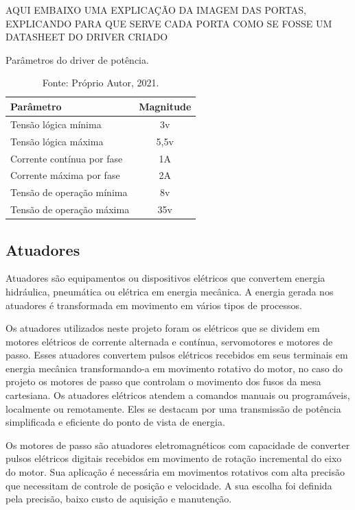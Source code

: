 AQUI EMBAIXO UMA EXPLICAÇÃO DA IMAGEM DAS PORTAS, EXPLICANDO PARA QUE SERVE CADA PORTA COMO SE 
FOSSE UM DATASHEET DO DRIVER CRIADO

\begin{table}
    \centering
    \caption{Parâmetros do driver de potência.}
    \begin{tabular}{lc}
        \hline
        \textbf{Parâmetro} & \textbf{Magnitude}\\
        \hline
        Tensão lógica mínima & 3v\\
        Tensão lógica máxima & 5,5v\\
        Corrente contínua por fase & 1A\\
        Corrente máxima por fase & 2A\\
        Tensão de operação mínima & 8v\\
        Tensão de operação máxima & 35v\\ 
        \hline       
    \end{tabular}
    \caption*{Fonte: Próprio Autor, 2021.}
    \label{tab:pdriver}
\end{table}

\subsection{Atuadores}\label{subsec:metatuadores}

Atuadores são equipamentos ou dispositivos elétricos que convertem energia hidráulica, pneumática ou elétrica em energia 
mecânica. A energia gerada nos atuadores é transformada em movimento em vários tipos de processos.

Os atuadores utilizados neste projeto foram os elétricos que se dividem em  motores elétricos de corrente alternada 
e contínua, servomotores e motores de passo. Esses atuadores convertem pulsos elétricos recebidos em seus terminais 
em energia mecânica transformando-a em movimento rotativo do motor, no caso do projeto os motores de passo que controlam 
o movimento dos fusos da mesa cartesiana. Os atuadores elétricos atendem a comandos manuais ou programáveis, localmente 
ou remotamente. Eles se destacam por uma transmissão de potência simplificada e eficiente do ponto de vista de energia.

Os motores de passo são atuadores eletromagnéticos com capacidade de converter pulsos elétricos digitais recebidos em 
movimento de rotação incremental do eixo do motor. Sua aplicação é necessária em movimentos rotativos com alta precisão 
que necessitam de controle de posição e velocidade. A sua escolha foi definida pela precisão, baixo custo de aquisição 
e manutenção.


